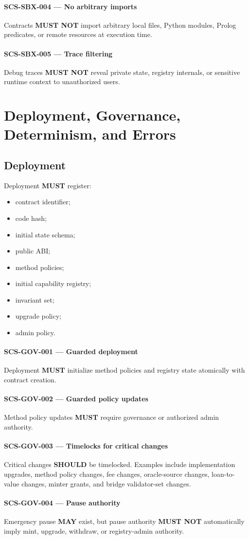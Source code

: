 \documentclass[11pt]{article}
\newcommand{\MUST}{\textbf{MUST}}
\newcommand{\MUSTNOT}{\textbf{MUST NOT}}
\newcommand{\SHOULD}{\textbf{SHOULD}}
\newcommand{\MAY}{\textbf{MAY}}
\newcommand{\req}[2]{\paragraph{#1}#2\par}
\begin{document}
\req{SCS-SBX-004 --- No arbitrary imports}{Contracts \MUSTNOT{} import arbitrary local files, Python modules, Prolog predicates, or remote resources at execution time.}

\req{SCS-SBX-005 --- Trace filtering}{Debug traces \MUSTNOT{} reveal private state, registry internals, or sensitive runtime context to unauthorized users.}



\section{Deployment, Governance, Determinism, and Errors}

\subsection{Deployment}

Deployment \MUST{} register:

\begin{itemize}
  \item contract identifier;
  \item code hash;
  \item initial state schema;
  \item public ABI;
  \item method policies;
  \item initial capability registry;
  \item invariant set;
  \item upgrade policy;
  \item admin policy.
\end{itemize}

\req{SCS-GOV-001 --- Guarded deployment}{Deployment \MUST{} initialize method policies and registry state atomically with contract creation.}

\req{SCS-GOV-002 --- Guarded policy updates}{Method policy updates \MUST{} require governance or authorized admin authority.}

\req{SCS-GOV-003 --- Timelocks for critical changes}{Critical changes \SHOULD{} be timelocked. Examples include implementation upgrades, method policy changes, fee changes, oracle-source changes, loan-to-value changes, minter grants, and bridge validator-set changes.}

\req{SCS-GOV-004 --- Pause authority}{Emergency pause \MAY{} exist, but pause authority \MUSTNOT{} automatically imply mint, upgrade, withdraw, or registry-admin authority.}
\end{document}
